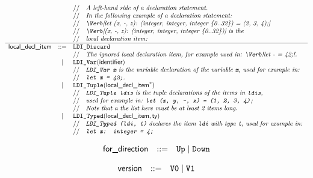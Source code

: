 \documentclass{book}
\begin{document}
\[
\begin{array}{rcl}
  & & \ASTComment{A left-hand side of a declaration statement.}\\
  & & \ASTComment{In the following example of a declaration statement:}\\
  & & \ASTComment{\Verb|let (x, -, z): (integer, integer, integer \{0..32\}) = (2, 3, 4);|}\\
  & & \ASTComment{\Verb|(x, -, z): (integer, integer, integer \{0..32\})| is the}\\
  & & \ASTComment{local declaration item:}\\
  \hline
\localdeclitem &::=
    & \texttt{LDI\_Discard}\\
  & & \ASTComment{The ignored local declaration item, for example used in: \Verb!let - = 42;!.}\\
  &|& \texttt{LDI\_Var}(\identifier)\\
  & & \ASTComment{\texttt{LDI\_Var x} is the variable declaration of the variable \texttt{x}, used for example in:}\\
  & & \ASTComment{\texttt{let x = 42;}.}\\
  &|& \texttt{LDI\_Tuple}(\localdeclitem^*)\\
  & & \ASTComment{\texttt{LDI\_Tuple ldis} is the tuple declarations of the items in \texttt{ldis},}\\
  & & \ASTComment{used for example in: \texttt{let (x, y, -, z) = (1, 2, 3, 4);}}\\
  & & \ASTComment{Note that a the list here must be at least 2 items long.}\\
  &|& \texttt{LDI\_Typed}(\localdeclitem, \ty)\\
  & & \ASTComment{\texttt{LDI\_Typed (ldi, t)} declares the item \texttt{ldi} with type \texttt{t}, used for example in:} \\
  & & \ASTComment{\texttt{let x: integer = 4;}}
\end{array}
\]

\[
\begin{array}{rcl}
\textsf{for\_direction} &::=& \texttt{Up} \;|\; \texttt{Down}\\
\end{array}
\]

\[
\begin{array}{rcl}
\textsf{version} &::=& \texttt{V0} \;|\; \texttt{V1}\\
\end{array}
\]
\end{document}

